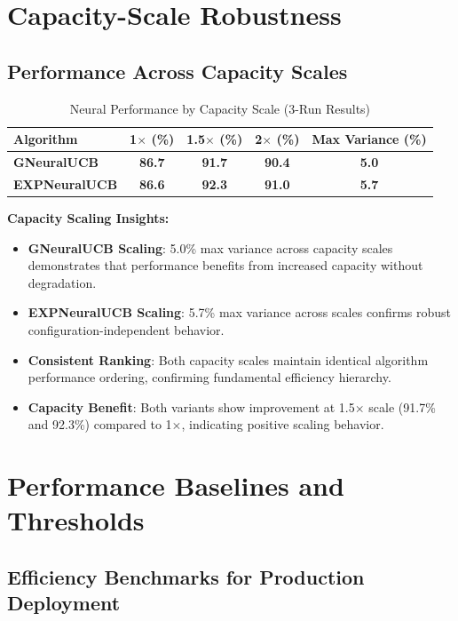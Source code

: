\documentclass[12pt,a4paper]{article}
\newcommand{\success}[1]{\textcolor{accentgreen}{\textbf{#1}}}
\newcommand{\legacy}[1]{\textcolor{legacycolor}{\textbf{#1}}}
\newcommand{\neural}[1]{\textcolor{neuralcolor}{\textbf{#1}}}
\begin{document}
\section{Capacity-Scale Robustness}

\subsection{Performance Across Capacity Scales}

\begin{table}[H]
\centering
\caption{Neural Performance by Capacity Scale (3-Run Results)}
\label{tab:capacity-scale}
\begin{tabular}{@{}lcccc@{}}
\toprule
\textbf{Algorithm} & \textbf{1$\times$ (\%)} & \textbf{1.5$\times$ (\%)} & \textbf{2$\times$ (\%)} & \textbf{Max Variance (\%)} \\
\midrule
\neural{GNeuralUCB}            & \neural{86.7} & \neural{91.7} & \neural{90.4} & \neural{5.0} \\
\legacy{EXPNeuralUCB}           & \legacy{86.6} & \legacy{92.3} & \legacy{91.0} & \legacy{5.7} \\
\bottomrule
\end{tabular}
\end{table}

\textbf{Capacity Scaling Insights:}
\begin{itemize}
\item \neural{GNeuralUCB Scaling}: 5.0\% max variance across capacity scales demonstrates that performance benefits from increased capacity without degradation.
\item \legacy{EXPNeuralUCB Scaling}: 5.7\% max variance across scales confirms robust configuration-independent behavior.
\item \success{Consistent Ranking}: Both capacity scales maintain identical algorithm performance ordering, confirming fundamental efficiency hierarchy.
\item \neural{Capacity Benefit}: Both variants show improvement at 1.5$\times$ scale (91.7\% and 92.3\%) compared to 1$\times$, indicating positive scaling behavior.
\end{itemize}

\section{Performance Baselines and Thresholds}

\subsection{Efficiency Benchmarks for Production Deployment}
\end{document}
